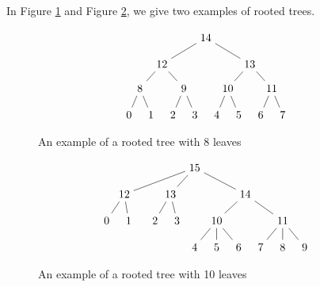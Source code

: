 \documentclass[smallextended, envcountsame, numbook]{svjour3}
\numberwithin{equation}{section}
\begin{document}
\begin{example}
In Figure \ref{fig:tree1} and Figure \ref{fig:tree2}, we give two examples of rooted trees.
\end{example}
\begin{figure}[h!]
\[\begin{tikzpicture}[scale=.7]
  \node (0) at (-4,0) {$0$};
  \node (1) at (-3,0) {$1$};
  \node (2) at (-2,0) {$2$};
  \node (3) at (-1,0) {$3$};
    \node (4) at (0,0) {$4$};
  \node (5) at (1,0) {$5$};
  \node (6) at (2,0) {$6$};
  \node (7) at (3,0) {$7$};
  \node (8) at (-3.5,1.2) {$8$};
  \node (9) at (-1.5,1.2) {$9$};
  \node (10) at (.5,1.2) {$10$};
  \node (11) at (2.5,1.2) {$11$};
    \node (12) at (-2.5,2.3) {$12$};
  \node (13) at (1.5,2.3) {$13$};
  \node (14) at (-.5,3.5) {$14$};
  \draw (0)--(8);
  \draw (1)--(8);
  \draw (2)--(9);
  \draw (3)--(9);
  \draw (4)--(10);
  \draw (5)--(10);
  \draw (6)--(11);
  \draw (7)--(11);
  \draw (8)--(12);
  \draw (9)--(12);
  \draw (10)--(13);
  \draw (11)--(13);
  \draw (12)--(14);
  \draw (13)--(14);
\end{tikzpicture}\]
\caption{\label{fig:tree1} An example of a rooted tree with $8$ leaves}
\end{figure}


\begin{figure}[h!]
\[\begin{tikzpicture}[scale=.7]
  \node (0) at (-4,0) {$0$};
  \node (1) at (-3,0) {$1$};
  \node (2) at (-1.8,0) {$2$};
  \node (3) at (-0.8,0) {$3$};
    \node (4) at (0,-1.2) {$4$};
  \node (5) at (1,-1.2) {$5$};
  \node (6) at (2,-1.2) {$6$};
  \node (7) at (3,-1.2) {$7$};
  \node (8) at (4,-1.2) {$8$};
  \node (9) at (5,-1.2) {$9$};
  \node (10) at (1, 0) {$10$};
  \node (11) at (4,0) {$11$};
    \node (12) at (-3.2,1.2) {$12$};
  \node (13) at (-1.1,1.2) {$13$};
  \node (14) at (2.3,1.2) {$14$};
  \node (15) at (0,2.4) {$15$};
 \draw (0)--(12);
  \draw (1)--(12);
  \draw (2)--(13);
  \draw (3)--(13);
  \draw (4)--(10);
  \draw (5)--(10);
  \draw (6)--(10);
  \draw (7)--(11);
  \draw (8)--(11);
  \draw (9)--(11);
  \draw (10)--(14);
  \draw (11)--(14);
  \draw (12)--(15);
  \draw (13)--(15);
  \draw (14)--(15);
\end{tikzpicture}\]
\caption{\label{fig:tree2} An example of a rooted tree with 10  leaves}
\end{figure}
\end{document}
